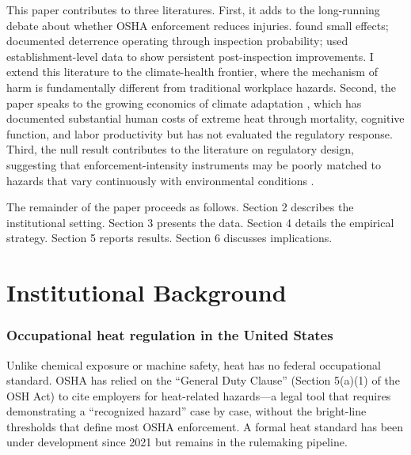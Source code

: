 \documentclass[12pt]{article}
\begin{document}
This paper contributes to three literatures. First, it adds to the long-running debate about whether OSHA enforcement reduces injuries. \citet{viscusi1979impact} found small effects; \citet{gray1993osha} documented deterrence operating through inspection probability; \citet{ko2014osha} used establishment-level data to show persistent post-inspection improvements. I extend this literature to the climate-health frontier, where the mechanism of harm is fundamentally different from traditional workplace hazards. Second, the paper speaks to the growing economics of climate adaptation \citep{barreca2016adapting, dell2012temperature, burke2015global}, which has documented substantial human costs of extreme heat through mortality, cognitive function, and labor productivity \citep{deschenes2011climate, park2020heat, graff2014temperature} but has not evaluated the regulatory response. Third, the null result contributes to the literature on regulatory design, suggesting that enforcement-intensity instruments may be poorly matched to hazards that vary continuously with environmental conditions \citep{barwick2020pollution, hanna2016environmental}.

The remainder of the paper proceeds as follows. Section 2 describes the institutional setting. Section 3 presents the data. Section 4 details the empirical strategy. Section 5 reports results. Section 6 discusses implications.


\section{Institutional Background}

\subsubsection*{Occupational heat regulation in the United States} Unlike chemical exposure or machine safety, heat has no federal occupational standard. OSHA has relied on the ``General Duty Clause'' (Section 5(a)(1) of the OSH Act) to cite employers for heat-related hazards---a legal tool that requires demonstrating a ``recognized hazard'' case by case, without the bright-line thresholds that define most OSHA enforcement. A formal heat standard has been under development since 2021 but remains in the rulemaking pipeline.
\end{document}
